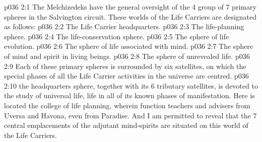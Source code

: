 \vs p036 2:1 The Melchizedeks have the general oversight of the 4 group of 7 primary spheres in the Salvington circuit. These worlds of the Life Carriers are designated as follows:
\vs p036 2:2 \bibnobreakspace The Life Carrier headquarters.
\vs p036 2:3 \bibnobreakspace The life\hyp{}planning sphere.
\vs p036 2:4 \bibnobreakspace The life\hyp{}conservation sphere.
\vs p036 2:5 \bibnobreakspace The sphere of life evolution.
\vs p036 2:6 \bibnobreakspace The sphere of life associated with mind.
\vs p036 2:7 \bibnobreakspace The sphere of mind and spirit in living beings.
\vs p036 2:8 \bibnobreakspace The sphere of unrevealed life.
\vs p036 2:9 \pc Each of these primary spheres is surrounded by six satellites, on which the special phases of all the Life Carrier activities in the universe are centred.
\vs p036 2:10 \pc {} the headquarters sphere, together with its 6 tributary satellites, is devoted to the study of universal life, life in all of its known phases of manifestation. Here is located the college of life planning, wherein function teachers and advisers from Uversa and Havona, even from Paradise. And I am permitted to reveal that the 7 central emplacements of the adjutant mind\hyp{}spirits are situated on this world of the Life Carriers.
